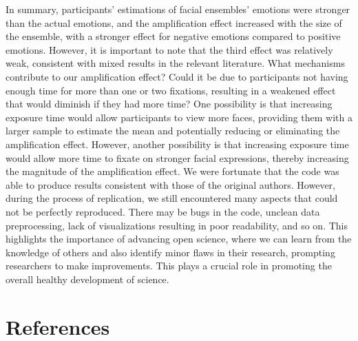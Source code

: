 \documentclass[
  man]{apa6}
\begin{document}
In summary, participants' estimations of facial ensembles' emotions were stronger than the actual emotions, and the amplification effect increased with the size of the ensemble, with a stronger effect for negative emotions compared to positive emotions. However, it is important to note that the third effect was relatively weak, consistent with mixed results in the relevant literature. What mechanisms contribute to our amplification effect? Could it be due to participants not having enough time for more than one or two fixations, resulting in a weakened effect that would diminish if they had more time? One possibility is that increasing exposure time would allow participants to view more faces, providing them with a larger sample to estimate the mean and potentially reducing or eliminating the amplification effect. However, another possibility is that increasing exposure time would allow more time to fixate on stronger facial expressions, thereby increasing the magnitude of the amplification effect.
We were fortunate that the code was able to produce results consistent with those of the original authors. However, during the process of replication, we still encountered many aspects that could not be perfectly reproduced. There may be bugs in the code, unclean data preprocessing, lack of visualizations resulting in poor readability, and so on. This highlights the importance of advancing open science, where we can learn from the knowledge of others and also identify minor flaws in their research, prompting researchers to make improvements. This plays a crucial role in promoting the overall healthy development of science.

\newpage

\hypertarget{references}{%
\section{References}\label{references}}
\end{document}
